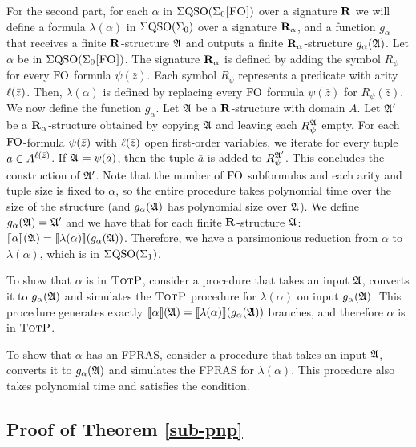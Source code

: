 \vspace{1em}
For the second part, for each $\alpha$ in $\Sigma{\rm QSO}(\Sigma_{0}\textsc{[FO]})$ over a signature $\mathbf{R}$ we will define a formula $\lambda(\alpha)$ in $\Sigma{\rm QSO}(\Sigma_{0})$ over a signature $\mathbf{R}_{\alpha}$, and a function $g_{\alpha}$ that receives a finite $\mathbf{R}$-structure $\mathfrak{A}$ and outputs a finite $\mathbf{R}_{\alpha}$-structure $g_{\alpha}(\mathfrak{A})$. Let $\alpha$ be in $\Sigma{\rm QSO}(\Sigma_{0}\textsc{[FO]})$. The signature $\mathbf{R}_{\alpha}$ is defined by adding the symbol $R_{\psi}$ for every ${\rm FO}$ formula $\psi(\bar{z})$. Each symbol $R_{\psi}$ represents a predicate with arity $\ell(\bar{z})$. Then, $\lambda(\alpha)$ is defined by replacing every ${\rm FO}$ formula $\psi(\bar{z})$ for $R_{\psi}(\bar{z})$. We now define the function $g_{\alpha}$. Let $\mathfrak{A}$ be a $\mathbf{R}$-structure with domain $A$. Let $\mathfrak{A}'$ be a $\mathbf{R}_{\alpha}$-structure obtained by copying $\mathfrak{A}$ and leaving each $R_{\psi}^{\mathfrak{A}}$ empty. For each ${\rm FO}$-formula $\psi(\bar{z})$ with $\ell(\bar{z})$ open first-order variables, we iterate for every tuple $\bar{a} \in A^{\ell(\bar{z})}$. If $\mathfrak{A}\models\psi(\bar{a})$, then the tuple $\bar{a}$ is added to $R_{\psi}^{\mathfrak{A}'}$. This concludes the construction of $\mathfrak{A}'$. Note that the number of ${\rm FO}$ subformulas and each arity and tuple size is fixed to $\alpha$, so the entire procedure takes polynomial time over the size of the structure (and $g_{\alpha}(\mathfrak{A})$ has polynomial size over $\mathfrak{A}$). We define $g_{\alpha}(\mathfrak{A}) = \mathfrak{A}'$ and we have that for each finite $\mathbf{R}$-structure $\mathfrak{A}$: ${\llbracket{}{\alpha}\rrbracket}(\mathfrak{A}) = {\llbracket{}{\lambda(\alpha)}\rrbracket}(g_{\alpha}(\mathfrak{A}))$. Therefore, we have a parsimonious reduction from $\alpha$ to $\lambda(\alpha)$, which is in $\Sigma{\rm QSO}(\Sigma_{1})$.

To show that $\alpha$ is in $\text{\sc TotP}$, consider a procedure that takes an input $\mathfrak{A}$, converts it to $g_{\alpha}(\mathfrak{A})$ and simulates the $\text{\sc TotP}$ procedure for $\lambda(\alpha)$ on input $g_{\alpha}(\mathfrak{A})$. This procedure generates exactly ${\llbracket{}{\alpha}\rrbracket}(\mathfrak{A}) = {\llbracket{}{\lambda(\alpha)}\rrbracket}(g_{\alpha}(\mathfrak{A}))$ branches, and therefore $\alpha$ is in $\text{\sc TotP}$.

To show that $\alpha$ has an FPRAS, consider a procedure that takes an input $\mathfrak{A}$, converts it to $g_{\alpha}(\mathfrak{A})$ and simulates the FPRAS for $\lambda(\alpha)$. This procedure also takes polynomial time and satisfies the condition.










\subsection*{Proof of Theorem \ref{sub-pnp}}


